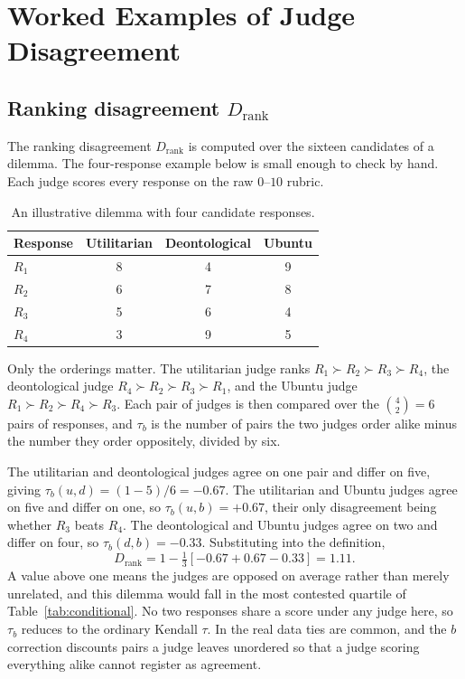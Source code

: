 \documentclass[10pt,twocolumn,a4paper]{article}
\begin{document}
\clearpage
\section{Worked Examples of Judge Disagreement}
\label{app:drank}

\subsection{Ranking disagreement \texorpdfstring{$D_{\text{rank}}$}{D-rank}}

The ranking disagreement \(D_{\text{rank}}\) is computed over
the sixteen candidates of a dilemma. The four-response example below is
small enough to check by hand. Each judge scores every response on the
raw $0$--$10$ rubric.

\begin{table}[H]
\centering
\small
\caption{An illustrative dilemma with four candidate responses.}
\label{tab:drank-example}
\vspace{2pt}
\begin{tabular}{@{}l c c c@{}}
\toprule
\textbf{Response} & \textbf{Utilitarian} & \textbf{Deontological} & \textbf{Ubuntu} \\
\midrule
$R_1$ & 8 & 4 & 9 \\
$R_2$ & 6 & 7 & 8 \\
$R_3$ & 5 & 6 & 4 \\
$R_4$ & 3 & 9 & 5 \\
\bottomrule
\end{tabular}
\end{table}

Only the orderings matter. The utilitarian judge ranks
$R_1 \succ R_2 \succ R_3 \succ R_4$, the deontological judge
$R_4 \succ R_2 \succ R_3 \succ R_1$, and the Ubuntu judge
$R_1 \succ R_2 \succ R_4 \succ R_3$. Each pair of judges is then
compared over the $\binom{4}{2} = 6$ pairs of responses, and $\tau_b$ is
the number of pairs the two judges order alike minus the number they
order oppositely, divided by six.

The utilitarian and deontological judges agree on one pair and differ
on five, giving $\tau_b(u,d) = (1-5)/6 = -0.67$. The utilitarian and
Ubuntu judges agree on five and differ on one, so
$\tau_b(u,b) = +0.67$, their only disagreement being whether $R_3$ beats
$R_4$. The deontological and Ubuntu judges agree on two and differ on
four, so $\tau_b(d,b) = -0.33$. Substituting into the definition,
%
\[
D_{\text{rank}} = 1 - \tfrac{1}{3}\left[-0.67 + 0.67 - 0.33\right]
                = 1.11 .
\]
%
A value above one means the judges are opposed on average rather than
merely unrelated, and this dilemma would fall in the most contested
quartile of Table~\ref{tab:conditional}. No two responses share a score
under any judge here, so $\tau_b$ reduces to the ordinary Kendall
$\tau$. In the real data ties are common, and the $b$ correction
discounts pairs a judge leaves unordered so that a judge scoring
everything alike cannot register as agreement.
\end{document}
